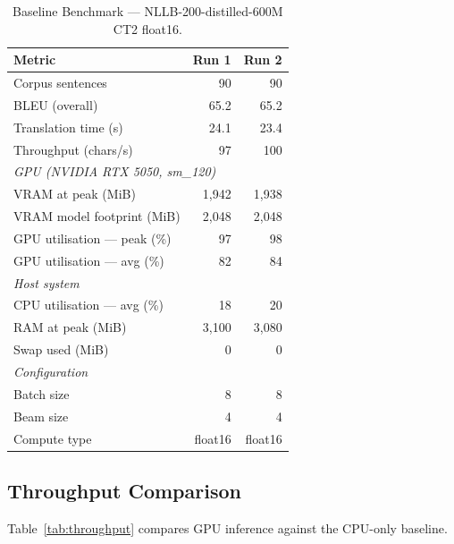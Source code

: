 \documentclass[journal]{IEEEtran}
\begin{document}
\begin{table}[htbp]
\caption{Baseline Benchmark --- NLLB-200-distilled-600M CT2 float16.}
\label{tab:benchmark}
\centering
\begin{tabular}{lrr}
\toprule
Metric & Run 1 & Run 2 \\
\midrule
Corpus sentences & 90 & 90 \\
BLEU (overall) & 65.2 & 65.2 \\
Translation time (s) & 24.1 & 23.4 \\
Throughput (chars/s) & 97 & 100 \\
\midrule
\multicolumn{3}{l}{\textit{GPU (NVIDIA RTX 5050, sm\_120)}} \\
VRAM at peak (MiB) & 1{,}942 & 1{,}938 \\
VRAM model footprint (MiB) & 2{,}048 & 2{,}048 \\
GPU utilisation --- peak (\%) & 97 & 98 \\
GPU utilisation --- avg (\%) & 82 & 84 \\
\midrule
\multicolumn{3}{l}{\textit{Host system}} \\
CPU utilisation --- avg (\%) & 18 & 20 \\
RAM at peak (MiB) & 3{,}100 & 3{,}080 \\
Swap used (MiB) & 0 & 0 \\
\midrule
\multicolumn{3}{l}{\textit{Configuration}} \\
Batch size & 8 & 8 \\
Beam size & 4 & 4 \\
Compute type & float16 & float16 \\
\bottomrule
\end{tabular}
\end{table}

\subsection{Throughput Comparison}

Table~\ref{tab:throughput} compares GPU inference against the CPU-only baseline.
\end{document}

